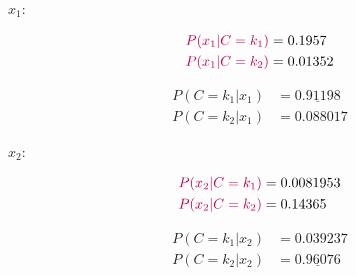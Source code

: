 \documentclass[12pt]{article}
\begin{document}
\begin{enumerate}[leftmargin=\labelsep]
\begin{enumerate}[leftmargin=\labelsep]
\begin{paracol}{3}
                  $x_1$:

                  \begin{normalsize}
                    \begin{equation*}
                      \begin{aligned}
                        \textcolor{purple}{P(x_1 | C = k_1)} & = 0.1957  \\
                        \textcolor{purple}{P(x_1 | C = k_2)} & = 0.01352
                      \end{aligned}
                    \end{equation*}

                    \begin{equation*}
                      \begin{aligned}
                        P(C = k_1 | x_1) & = \underline{0.91198} \\
                        P(C = k_2 | x_1) & = 0.088017
                      \end{aligned}
                    \end{equation*}
                  \end{normalsize}

                  \switchcolumn

                  $x_2$:

                  \begin{normalsize}
                    \begin{equation*}
                      \begin{aligned}
                        \textcolor{purple}{P(x_2 | C = k_1)} & = 0.0081953 \\
                        \textcolor{purple}{P(x_2 | C = k_2)} & = 0.14365
                      \end{aligned}
                    \end{equation*}

                    \begin{equation*}
                      \begin{aligned}
                        P(C = k_1 | x_2) & = 0.039237            \\
                        P(C = k_2 | x_2) & = \underline{0.96076}
                      \end{aligned}
                    \end{equation*}
                  \end{normalsize}


\end{paracol}
\end{enumerate}
\end{enumerate}
\end{document}

